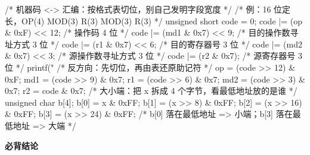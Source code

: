 \documentclass[10pt,a4paper]{ctexart}
\begin{document}
\begin{codebox}
/* 机器码 <-> 汇编：按格式表切位，别自己发明字段宽度 */
/* 例：16 位定长，OP(4) MOD(3) R(3) MOD(3) R(3) */
unsigned short code = 0;
code |= (op & 0xF) << 12;                  /* 操作码 4 位 */
code |= (md1 & 0x7) << 9;                  /* 目的操作数寻址方式 3 位 */
code |= (r1 & 0x7) << 6;                   /* 目的寄存器号 3 位 */
code |= (md2 & 0x7) << 3;                  /* 源操作数寻址方式 3 位 */
code |= (r2 & 0x7);                        /* 源寄存器号 3 位 */
printf("%
/* 反方向：先切位，再由表还原助记符 */
op  = (code >> 12) & 0xF;  md1 = (code >> 9) & 0x7;  r1 = (code >> 6) & 0x7;
md2 = (code >> 3)  & 0x7;  r2  =  code        & 0x7;
/* 大小端：把 x 拆成 4 个字节，看最低地址放的是谁 */
unsigned char b[4];
b[0] = x & 0xFF; b[1] = (x >> 8) & 0xFF;
b[2] = (x >> 16) & 0xFF; b[3] = (x >> 24) & 0xFF;
/* b[0] 落在最低地址 => 小端；b[3] 落在最低地址 => 大端 */
\end{codebox}




\textbf{必背结论}
\end{document}
